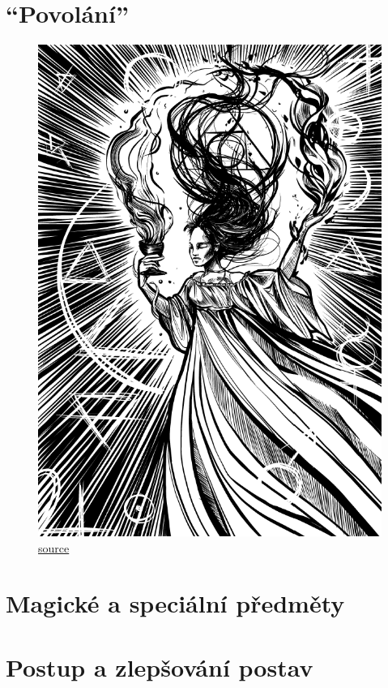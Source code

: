 \documentclass[12pt,a4paper,twoside,openany]{book}
\begin{document}
\chapter{``Povolání''}
\label{chap:speciality}


\begin{figure}[h!]
  \centering
  \caption{\href{https://petrakubaskova.cz/wp-content/uploads/2024/07/elixir-cze.png}{source}}
  \includegraphics[width=\textwidth]{carodejka}
\end{figure}


\chapter{Magické a speciální předměty}
\label{chap:magicke-spec-predmety}



\chapter{Postup a zlepšování postav}
\label{chap:postup}

\end{document}
